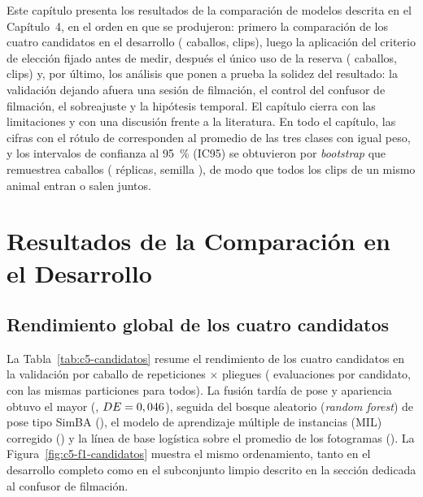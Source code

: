 
Este capítulo presenta los resultados de la comparación de modelos descrita en el Capítulo~4, en el orden en que se produjeron: primero la comparación de los cuatro candidatos en el desarrollo (\CaballosDesarrollo{} caballos, \ClipsDesarrollo{} clips), luego la aplicación del criterio de elección fijado antes de medir, después el único uso de la reserva (\CaballosReserva{} caballos, \ClipsReserva{} clips) y, por último, los análisis que ponen a prueba la solidez del resultado: la validación dejando afuera una sesión de filmación, el control del confusor de filmación, el sobreajuste y la hipótesis temporal. El capítulo cierra con las limitaciones y con una discusión frente a la literatura. En todo el capítulo, las cifras con el rótulo de \fmacro{} corresponden al promedio de las tres clases con igual peso, y los intervalos de confianza al 95~\% (IC95) se obtuvieron por \textit{bootstrap} que remuestrea caballos (\ReplicasBootstrap{} réplicas, semilla \SemillaBootstrap{}), de modo que todos los clips de un mismo animal entran o salen juntos.

\section{Resultados de la Comparación en el Desarrollo}
\subsection{Rendimiento global de los cuatro candidatos}
La Tabla~\ref{tab:c5-candidatos} resume el rendimiento de los cuatro candidatos en la validación por caballo de \Repeticiones{} repeticiones $\times$ \Folds{} pliegues (\Evaluaciones{} evaluaciones por candidato, con las mismas particiones para todos). La fusión tardía de pose y apariencia obtuvo el mayor \fmacro{} (\FusionDevF{}, $DE = 0,046{}$), seguida del bosque aleatorio (\textit{random forest}) de pose tipo SimBA (\RFPoseDevF{}), el modelo de aprendizaje múltiple de instancias (MIL) corregido (\MILDevF{}) y la línea de base logística sobre el promedio de los fotogramas (\BaseDevF{}). La Figura~\ref{fig:c5-f1-candidatos} muestra el mismo ordenamiento, tanto en el desarrollo completo como en el subconjunto limpio descrito en la sección dedicada al confusor de filmación.

